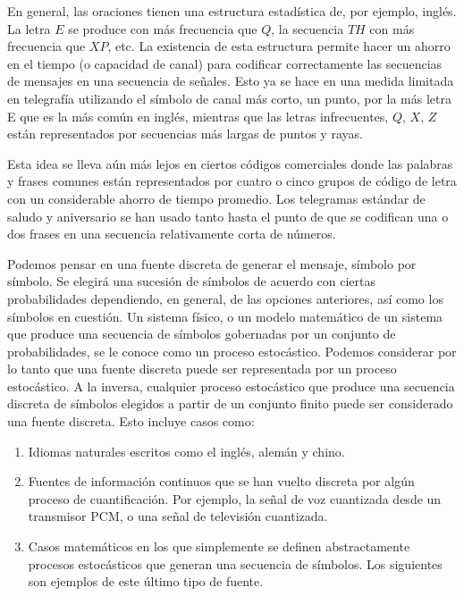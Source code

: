 En general, las oraciones tienen una estructura estad\'istica de, por
ejemplo, ingl\'es. La letra $E$ se produce con m\'as frecuencia que
$Q$, la secuencia $TH$ con m\'as frecuencia que $XP$, etc. La
existencia de esta estructura permite hacer un ahorro en el tiempo (o
capacidad de canal) para codificar correctamente las secuencias de
mensajes en una secuencia de se\~nales. Esto ya se hace en una medida
limitada en telegraf\'ia utilizando el s\'imbolo de canal m\'as corto,
un punto, por la m\'as letra E que es la m\'as com\'un en ingl\'es,
mientras que las letras infrecuentes, $Q$, $X$, $Z$ est\'an
representados por secuencias m\'as largas de puntos y rayas.

Esta idea se lleva a\'un m\'as lejos en ciertos c\'odigos comerciales
donde las palabras y frases comunes est\'an representados por cuatro o
cinco grupos de c\'odigo de letra con un considerable ahorro de tiempo
promedio.  Los telegramas est\'andar de saludo y aniversario se han
usado tanto hasta el punto de que se codifican una o dos frases en una
secuencia relativamente corta de n\'umeros.

Podemos pensar en una fuente discreta de generar el mensaje, s\'imbolo
por s\'imbolo. Se elegir\'a una sucesi\'on de s\'imbolos de acuerdo
con ciertas probabilidades dependiendo, en general, de las opciones
anteriores, as\'i como los s\'imbolos en cuesti\'on. Un sistema
f\'isico, o un modelo matem\'atico de un sistema que produce una
secuencia de s\'imbolos gobernadas por un conjunto de probabilidades,
se le conoce como un proceso estoc\'astico.  Podemos considerar por lo
tanto que una fuente discreta puede ser representada por un proceso
estoc\'astico. A la inversa, cualquier proceso estoc\'astico que
produce una secuencia discreta de s\'imbolos elegidos a partir de un
conjunto finito puede ser considerado una fuente discreta. Esto
incluye casos como:

\begin{enumerate}
\item{Idiomas naturales escritos como el ingl\'es, alem\'an y chino.}

\item{Fuentes de informaci\'on continuos que se han vuelto discreta por
alg\'un proceso de cuantificaci\'on. Por ejemplo, la se\~nal de voz
cuantizada desde un transmisor PCM, o una se\~nal de televisi\'on
cuantizada.}

\item{Casos matem\'aticos en los que simplemente se definen abstractamente
procesos estoc\'asticos que generan una secuencia de s\'imbolos. Los
siguientes son ejemplos de este \'ultimo tipo de fuente.}
\end{enumerate}

